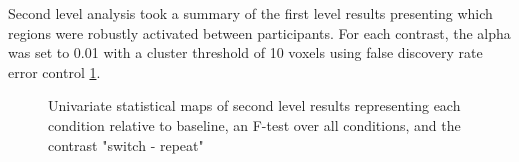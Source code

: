 \documentclass[10pt,letterpaper]{article}
\begin{document}
Second level analysis took a summary of the first level results presenting which
regions were robustly activated between participants.
For each contrast, the alpha was set to 0.01 with a cluster threshold of 10 voxels using
false discovery rate error control \ref{fig:stat_maps}.

\begin{figure}[H]
  \centering
\end{figure}

\begin{figure}[H]
  \ContinuedFloat
  \centering
\end{figure}

\begin{figure}[H]
  \ContinuedFloat
  \centering
\end{figure}

\begin{figure}[H]
  \ContinuedFloat
  \centering
  \caption{
    Univariate statistical maps of second level results representing
    each condition relative to baseline, an F-test over all conditions,
    and the contrast "switch - repeat"}
  \label{fig:stat_maps}
\end{figure}
\end{document}
